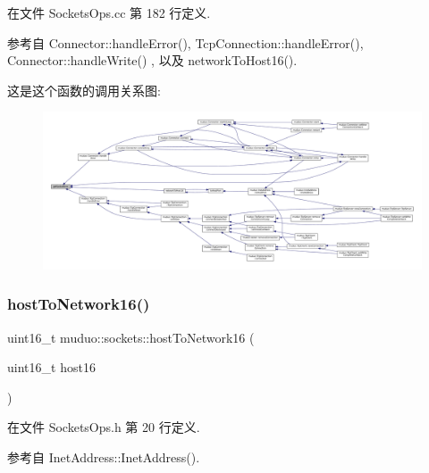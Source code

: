 在文件 Sockets\+Ops.\+cc 第 182 行定义.



参考自 Connector\+::handle\+Error(), Tcp\+Connection\+::handle\+Error(), Connector\+::handle\+Write() , 以及 network\+To\+Host16().

这是这个函数的调用关系图\+:
\nopagebreak
\begin{figure}[H]
\begin{center}
\leavevmode
\includegraphics[width=350pt]{namespacemuduo_1_1sockets_a80bd626331e049209f59d11c80a8b539_icgraph}
\end{center}
\end{figure}
\mbox{\label{namespacemuduo_1_1sockets_a2c7a9f8e753e01c481aaf287251fa18e}} 
\subsubsection{\texorpdfstring{host\+To\+Network16()}{hostToNetwork16()}}
{\footnotesize\ttfamily uint16\+\_\+t muduo\+::sockets\+::host\+To\+Network16 (\begin{DoxyParamCaption}\item[{uint16\+\_\+t}]{host16 }\end{DoxyParamCaption})\hspace{0.3cm}{\ttfamily [inline]}}



在文件 Sockets\+Ops.\+h 第 20 行定义.



参考自 Inet\+Address\+::\+Inet\+Address().

